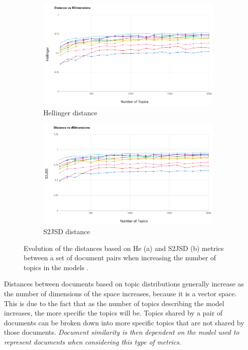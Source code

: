 \begin{figure}[]
\begin{subfigure}[b]{1.0\linewidth}
\centering
\includegraphics[width=\linewidth]{He_100_2k.png}
\caption{Hellinger distance}
\vspace{4ex}
\end{subfigure}
\begin{subfigure}[b]{1.0\linewidth}
\centering
\includegraphics[width=\linewidth]{S2JSD_100_2k.png}
\caption{S2JSD distance}
\vspace{4ex}
\end{subfigure}
\caption{Evolution of the distances based on He (a) and S2JSD (b) metrics between a set of document pairs when increasing the number of topics in the models  \citep{Badenes-Olmedo2020}.}
\label{fig:topic_distances2}
\end{figure}


Distances between documents based on topic distributions generally increase as the number of dimensions of the space increases, because it is a vector space. This is due to the fact that as the number of topics describing the model increases, the more specific the topics will be. Topics shared by a pair of documents can be broken down into more specific topics that are not shared by those documents. \textit{Document similarity is then dependent on the model used to represent documents when considering this type of metrics}. 

